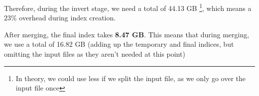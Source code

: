 \documentclass[11pt]{article}
\begin{document}
Therefore, during the invert stage, we need a total of 44.13 GB \footnote{In theory, we could use less if we split the input file, as we only go over
	the input file once}, which means a $23\%$ overhead during index creation.

After merging, the final index takes \textbf{8.47 GB}. This means that during merging, we use a total of 16.82 GB (adding up the temporary and final indices,
but omitting the input files as they aren't needed at this point)
\end{document}
